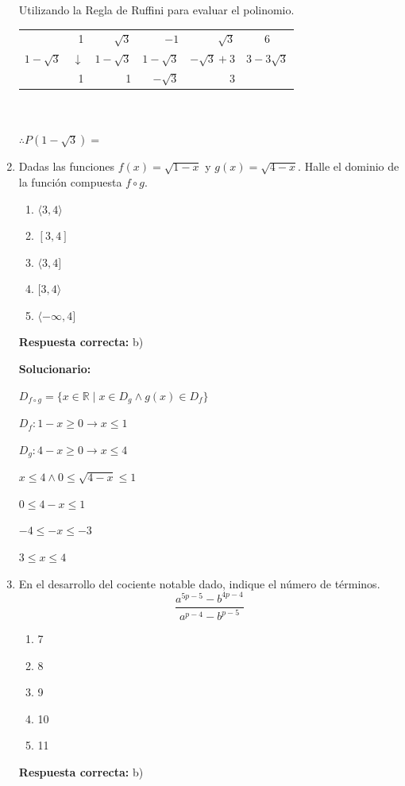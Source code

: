 \begin{enumerate}[resume]
	Utilizando la Regla de Ruffini para evaluar el polinomio.
	
	
	\begin{tabular}{r|rrrr|c}
		& 1 & $\sqrt{3}$ & $-1$ & $\sqrt{3}$ & 6 \\
		$1-\sqrt{3}$ & $\downarrow$ & $1-\sqrt{3}$ & $1-\sqrt{3}$ & $-\sqrt{3}+3$ & $3-3\sqrt{3}$ \\ \hline
		& 1 & 1 & $-\sqrt{3}$ & 3 & \fbox{$9-3\sqrt{3}$}
	\end{tabular} \\
	\\
	$\therefore P(1-\sqrt{3}) =$
	
	\vspace{6mm}
	
	\item Dadas las funciones $f(x) = \sqrt{1-x}$ y $g(x) = \sqrt{4-x}$. Halle el dominio de la función compuesta $f \circ g$.
	\begin{enumerate}[label=\alph*)]
		\item $\langle3,4\rangle$
		\item $[3, 4]$
		\item $\langle3, 4]$
		\item $[3, 4\rangle$
		\item $\langle -\infty , 4]$
	\end{enumerate}
	\textbf{Respuesta correcta:} b)
	
	\vspace{2mm}
	\textbf{Solucionario:}
	
	$D_{f \circ g} = \{ x \in \mathbb{R} \mid x \in D_g \wedge g(x) \in D_f \}$ 

	$D_f: 1-x \geq 0 \rightarrow x \leq 1$ 
	
	$D_g: 4-x \geq 0 \rightarrow x \leq 4$ 

	$x \leq 4 \wedge 0 \leq \sqrt{4-x} \leq 1$ 
	
	$0 \leq 4-x \leq 1$ 
	
	$-4 \leq -x \leq -3$ 
	
	$3 \leq x \leq 4$ 
	
	
	
	\vspace{6mm}
	
	\item En el desarrollo del cociente notable dado, indique el número de términos.
	\[
	\dfrac{a^{5p-5} - b^{4p-4}}{a^{p-4} - b^{p-5}}
	\]
	\begin{enumerate}[label=\alph*)]
		\item 7
		\item 8
		\item 9
		\item 10
		\item 11	
	\end{enumerate}
	\textbf{Respuesta correcta:} b)
	

\end{enumerate}
